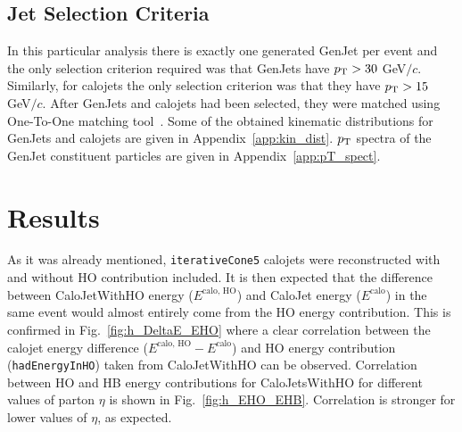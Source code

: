\documentclass{cmspaper}
\begin{document}
\subsection{Jet Selection Criteria}

In this particular analysis there is exactly one generated GenJet per event and the only selection criterion required was that GenJets have $p_\text T>30$ GeV$/c$. Similarly, for calojets the only selection criterion was that they have $p_\text T>15$ GeV$/c$. After GenJets and calojets had been selected, they were matched using One-To-One matching tool~\cite{ref:one_to_one}. Some of the obtained kinematic distributions for GenJets and calojets are given in Appendix~\ref{app:kin_dist}. $p_\text T$ spectra of the GenJet constituent particles are given in Appendix~\ref{app:pT_spect}.


\section{Results}
\label{sc:results}

As it was already mentioned, \texttt{iterativeCone5} calojets were reconstructed with and without HO contribution included. It is then expected that the difference between CaloJetWithHO energy ($E^\text{calo, HO}$) and CaloJet energy ($E^\text{calo}$) in the same event would almost entirely come from the HO energy contribution. This is confirmed in Fig.~\ref{fig:h_DeltaE_EHO} where a clear correlation between the calojet energy difference ($E^\text{calo, HO}-E^\text{calo}$) and HO energy contribution (\texttt{hadEnergyInHO}) taken from CaloJetWithHO can be observed. Correlation between HO and HB energy contributions for CaloJetsWithHO for different values of parton $\eta$ is shown in Fig.~\ref{fig:h_EHO_EHB}. Correlation is stronger for lower values of $\eta$, as expected. 
\end{document}
